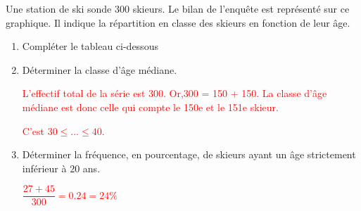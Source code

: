 \begin{corrige}
    Une station de ski sonde 300 skieurs. Le bilan de l'enquête est représenté sur ce graphique. Il indique la répartition en classe des skieurs en fonction de leur âge.

    \begin{enumerate}
        \item Compléter le tableau ci-dessous
        
        \hspace*{-5mm}

        \hspace*{-5mm}

        \hspace*{-5mm}

        \item Déterminer la classe d'âge médiane.
        
        \textcolor{red}{L’effectif total de la série est 300. Or,300 = 150 + 150. La classe d'âge médiane est donc celle qui compte le 150e et le 151e skieur.}

        \textcolor{red}{C'est $30\leq ... \leq 40$.}
        \item Déterminer la fréquence, en pourcentage, de skieurs ayant un âge strictement inférieur à 20 ans.
        
        \textcolor{red}{$\dfrac{27+45}{300}=\num{0.24}=24 \%$}
    \end{enumerate}   
\end{corrige}

